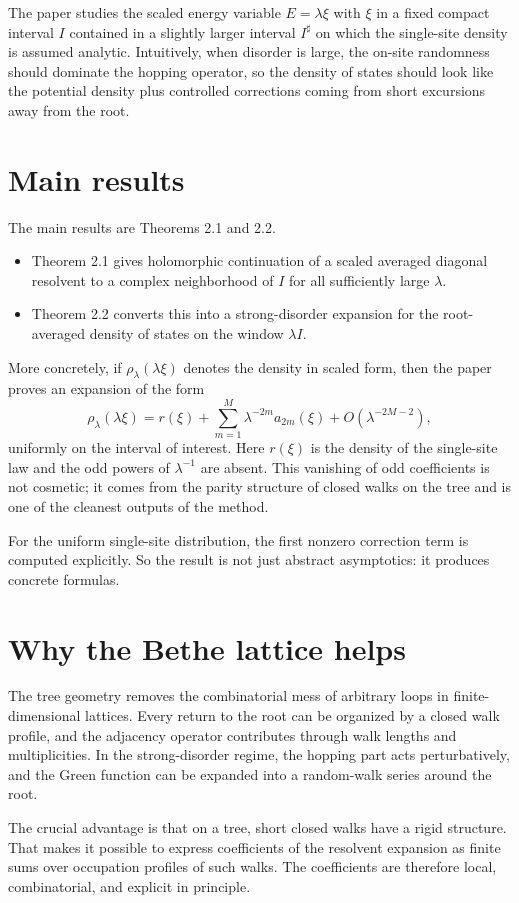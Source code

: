 \documentclass[11pt]{article}
\begin{document}
The paper studies the scaled energy variable $E=\lambda \xi$ with $\xi$ in a fixed compact interval $I$ contained in a slightly larger interval $I^{\sharp}$ on which the single-site density is assumed analytic. Intuitively, when disorder is large, the on-site randomness should dominate the hopping operator, so the density of states should look like the potential density plus controlled corrections coming from short excursions away from the root.
\section*{Main results}
The main results are Theorems 2.1 and 2.2.
\begin{itemize}[leftmargin=1.5em]
\item Theorem 2.1 gives holomorphic continuation of a scaled averaged diagonal resolvent to a complex neighborhood of $I$ for all sufficiently large $\lambda$.
\item Theorem 2.2 converts this into a strong-disorder expansion for the root-averaged density of states on the window $\lambda I$.
\end{itemize}
More concretely, if $\rho_\lambda(\lambda\xi)$ denotes the density in scaled form, then the paper proves an expansion of the form
\[
\rho_\lambda(\lambda\xi)
= r(\xi)+\sum_{m=1}^{M} \lambda^{-2m} a_{2m}(\xi)+O(\lambda^{-2M-2}),
\]
uniformly on the interval of interest. Here $r(\xi)$ is the density of the single-site law and the odd powers of $\lambda^{-1}$ are absent. This vanishing of odd coefficients is not cosmetic; it comes from the parity structure of closed walks on the tree and is one of the cleanest outputs of the method.

For the uniform single-site distribution, the first nonzero correction term is computed explicitly. So the result is not just abstract asymptotics: it produces concrete formulas.
\section*{Why the Bethe lattice helps}
The tree geometry removes the combinatorial mess of arbitrary loops in finite-dimensional lattices. Every return to the root can be organized by a closed walk profile, and the adjacency operator contributes through walk lengths and multiplicities. In the strong-disorder regime, the hopping part acts perturbatively, and the Green function can be expanded into a random-walk series around the root.

The crucial advantage is that on a tree, short closed walks have a rigid structure. That makes it possible to express coefficients of the resolvent expansion as finite sums over occupation profiles of such walks. The coefficients are therefore local, combinatorial, and explicit in principle.
\end{document}
